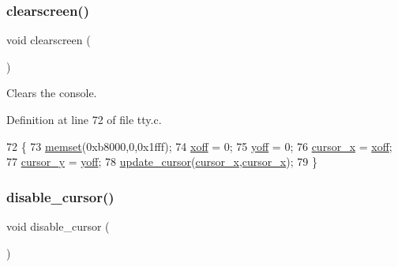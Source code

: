 \subsubsection{\texorpdfstring{clearscreen()}{clearscreen()}}
{\footnotesize\ttfamily void clearscreen (\begin{DoxyParamCaption}{ }\end{DoxyParamCaption})}



Clears the console. 



Definition at line 72 of file tty.\+c.


\begin{DoxyCode}
72                    \{
73     \hyperlink{a00119_a9e432f267691eceb2e2e0efcc37efbc9_a9e432f267691eceb2e2e0efcc37efbc9}{memset}(0xb8000,0,0x1fff);
74     \hyperlink{a00149_abaa0d20f0e52ce0d3a7d706f6ac16266_abaa0d20f0e52ce0d3a7d706f6ac16266}{xoff} = 0;
75     \hyperlink{a00149_a1a7539764d0ae8cd06ce45c62cf92bca_a1a7539764d0ae8cd06ce45c62cf92bca}{yoff} = 0;
76     \hyperlink{a00149_ae69604af0f9bd5fca2a016d0aa1ba7e1_ae69604af0f9bd5fca2a016d0aa1ba7e1}{cursor\_x} = \hyperlink{a00149_abaa0d20f0e52ce0d3a7d706f6ac16266_abaa0d20f0e52ce0d3a7d706f6ac16266}{xoff};
77     \hyperlink{a00149_a0301c5492919c401c2c1ecf52af709b0_a0301c5492919c401c2c1ecf52af709b0}{cursor\_y} = \hyperlink{a00149_a1a7539764d0ae8cd06ce45c62cf92bca_a1a7539764d0ae8cd06ce45c62cf92bca}{yoff};
78     \hyperlink{a00149_a492f5021d7340613e732ef37bbaa04e4_a492f5021d7340613e732ef37bbaa04e4}{update\_cursor}(\hyperlink{a00149_ae69604af0f9bd5fca2a016d0aa1ba7e1_ae69604af0f9bd5fca2a016d0aa1ba7e1}{cursor\_x},\hyperlink{a00149_ae69604af0f9bd5fca2a016d0aa1ba7e1_ae69604af0f9bd5fca2a016d0aa1ba7e1}{cursor\_x});
79 \}
\end{DoxyCode}
\mbox{\label{a00149_a3d09038c7b6436e60b228f2f3f451f6a_a3d09038c7b6436e60b228f2f3f451f6a}} 
\subsubsection{\texorpdfstring{disable\+\_\+cursor()}{disable\_cursor()}}
{\footnotesize\ttfamily void disable\+\_\+cursor (\begin{DoxyParamCaption}{ }\end{DoxyParamCaption})}




